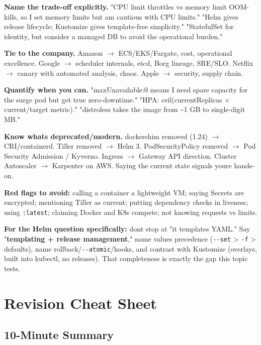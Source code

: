 \documentclass[11pt]{article}
\begin{document}
\textbf{Name the trade-off explicitly.} "CPU limit throttles vs memory limit OOM-kills, so I set memory limits but am cautious with CPU limits." "Helm gives release lifecycle; Kustomize gives template-free simplicity." "StatefulSet for identity, but consider a managed DB to avoid the operational burden."

\textbf{Tie to the company.} Amazon \(\rightarrow\) ECS/EKS/Fargate, cost, operational excellence. Google \(\rightarrow\) scheduler internals, etcd, Borg lineage, SRE/SLO. Netflix \(\rightarrow\) canary with automated analysis, chaos. Apple \(\rightarrow\) security, supply chain.

\textbf{Quantify when you can.} "maxUnavailable:0 means I need spare capacity for the surge pod but get true zero-downtime." "HPA: ceil(currentReplicas \(\times\) current/target metric)." "distroless takes the image from \textasciitilde1 GB to single-digit MB."

\textbf{Know what\textquotesingle s deprecated/modern.} dockershim removed (1.24) \(\rightarrow\) CRI/containerd. Tiller removed \(\rightarrow\) Helm 3. PodSecurityPolicy removed \(\rightarrow\) Pod Security Admission / Kyverno. Ingress \(\rightarrow\) Gateway API direction. Cluster Autoscaler \(\rightarrow\) Karpenter on AWS. Saying the current state signals you\textquotesingle re hands-on.

\textbf{Red flags to avoid:} calling a container a lightweight VM; saying Secrets are encrypted; mentioning Tiller as current; putting dependency checks in liveness; using \texttt{:latest}; claiming Docker and K8s compete; not knowing requests vs limits.

\textbf{For the Helm question specifically:} don\textquotesingle t stop at "it templates YAML." Say "\textbf{templating + release management}," name values precedence (\texttt{-\/-set} \textgreater{} \texttt{-f} \textgreater{} defaults), name rollback/\texttt{-\/-atomic}/hooks, and contrast with Kustomize (overlays, built into kubectl, no releases). That completeness is exactly the gap this topic tests.

\section{Revision Cheat Sheet}\label{revision-cheat-sheet}

\subsection{10-Minute Summary}\label{10-minute-summary}
\end{document}
